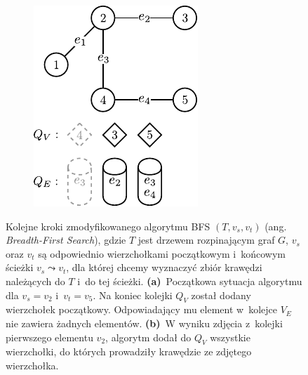 \begin{savenotes}
\begin{figure}[!h]
\begin{subfigure}[b]{0.22\textwidth}
			\caption{}
			\label{fig:bfsExample:c}
		\end{subfigure}
		\hfill
		\begin{subfigure}[b]{0.22\textwidth}
			\includegraphics[width=\textwidth]{Chapter_V/BFS-example/d}
			\caption{}
			\label{fig:bfsExample:d}
		\end{subfigure}
		\hfill\null
		\caption[Kolejne kroki zmodyfikowanego algorytmu \textsc{BFS} $\left( T, v_{s}, v_{t} \right)$]{
			Kolejne kroki zmodyfikowanego algorytmu \textsc{BFS} $\left( T, v_{s}, v_{t} \right)$ (ang. \textit{Breadth-First Search}), gdzie $T$ jest drzewem rozpinającym graf $G$, $v_{s}$ oraz $v_{t}$ są odpowiednio wierzchołkami początkowym i~końcowym ścieżki $v_{s} \leadsto v_{t}$, dla której chcemy wyznaczyć zbiór krawędzi należących do $T$ i~do tej ścieżki.
			\textbf{(a)}~Początkowa sytuacja algorytmu dla $v_{s} = v_{2}$ i~$v_{t} = v_{5}$.
			Na koniec kolejki $Q_{V}$ został dodany wierzchołek początkowy.
			Odpowiadający mu element w~kolejce $V_{E}$ nie zawiera żadnych elementów.
			\textbf{(b)}~W wyniku zdjęcia z~kolejki pierwszego elementu $v_{2}$, algorytm dodał do $Q_{V}$ wszystkie wierzchołki, do których prowadziły krawędzie ze zdjętego wierzchołka.
}
\end{figure}
\end{savenotes}
